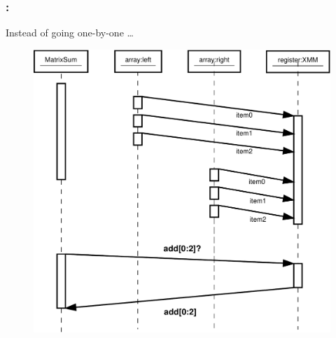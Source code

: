\documentclass[9pt,xcolor=table]{beamer}
\begin{document}
\begin{frame}
\frametitle{\insertsectionhead{}: \insertsubsectionhead{}}
\begin{block}{Instead of going one-by-one \dots{}}
  \begin{figure}[htb]
    \includegraphics[height=0.7\textheight]{img/ArrayFetchXMM}
  \end{figure}
\end{block}
\end{frame}
\end{document}
